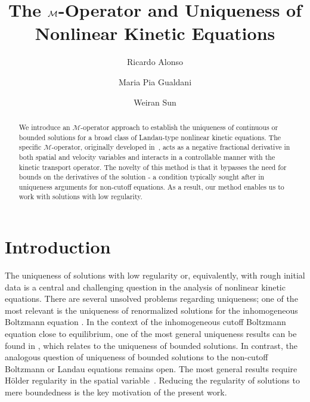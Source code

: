 \documentclass[11pt,american, reqno]{amsart}
\title[Uniqueness]{The $\CalM$-Operator and Uniqueness of Nonlinear Kinetic Equations}
\author{Ricardo Alonso}
\author{Maria Pia Gualdani}
\author{Weiran Sun}
\numberwithin{equation}{section}
\newcommand{\1}{\mathds{1}}
\newcommand{\CalM}{\mathcal{M}}
\numberwithin{equation}{section}
\begin{document}
\begin{abstract}
We introduce an $\CalM$-operator approach to establish the uniqueness of continuous or bounded solutions for a broad class of Landau-type nonlinear kinetic equations. The specific $\CalM$-operator, originally developed in~\cite{AMSY2020}, acts as a negative fractional derivative in both spatial and velocity variables and interacts in a controllable manner with the kinetic transport operator. The novelty of this method is that it bypasses the need for bounds on the derivatives of the solution - a condition typically sought after in uniqueness arguments for non-cutoff equations. As a result, our method enables us to work with solutions with low regularity. 
\end{abstract}
\maketitle


\section{Introduction} 
The uniqueness of solutions with low regularity or, equivalently, with rough initial data is a central and challenging question in the analysis of nonlinear kinetic equations.  There are several unsolved problems regarding uniqueness; one of the most relevant is the uniqueness of renormalized solutions for the inhomogeneous Boltzmann equation \cite{DL}.  %
In the context of the inhomogeneous cutoff Boltzmann equation close to equilibrium, one of the most general uniqueness results can be found in \cite{GMM}, which relates to the uniqueness of bounded solutions. In contrast, the analogous question of uniqueness of bounded solutions to the non-cutoff Boltzmann or Landau equations remains open. The most general results require H\"older regularity in the spatial variable~\cite{AMUXY2011,DLSS2020, HST2020, HST2025, HW2024}. Reducing the regularity of solutions to mere boundedness is the key motivation of the present work.
\end{document}
